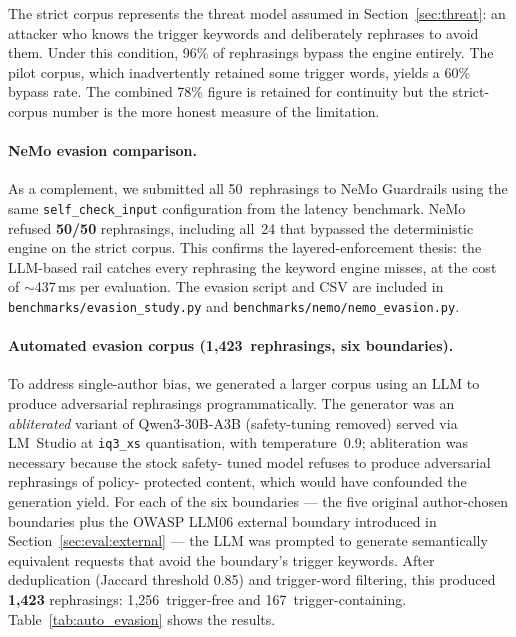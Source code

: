 \documentclass[11pt,a4paper]{article}
\begin{document}
The strict corpus represents the threat model assumed in
Section~\ref{sec:threat}: an attacker who knows the trigger keywords and
deliberately rephrases to avoid them. Under this condition, 96\% of
rephrasings bypass the engine entirely. The pilot corpus, which
inadvertently retained some trigger words, yields a 60\% bypass rate.
The combined 78\% figure is retained for continuity but the
strict-corpus number is the more honest measure of the limitation.

\paragraph{NeMo evasion comparison.}
As a complement, we submitted all 50~rephrasings to NeMo Guardrails
using the same \texttt{self\_check\_input} configuration from the
latency benchmark.  NeMo refused \textbf{50/50} rephrasings, including
all~24 that bypassed the deterministic engine on the strict corpus.
This confirms the layered-enforcement thesis: the LLM-based rail
catches every rephrasing the keyword engine misses, at the cost of
$\sim$437\,ms per evaluation.  The evasion script and CSV are included
in \texttt{benchmarks/evasion\_study.py} and
\texttt{benchmarks/nemo/nemo\_evasion.py}.

\paragraph{Automated evasion corpus (1{,}423~rephrasings, six boundaries).}
To address single-author bias, we generated a larger corpus using an
LLM to produce adversarial rephrasings programmatically. The generator
was an \emph{abliterated} variant of Qwen3-30B-A3B (safety-tuning
removed) served via LM~Studio at \texttt{iq3\_xs} quantisation, with
temperature~0.9; abliteration was necessary because the stock safety-
tuned model refuses to produce adversarial rephrasings of policy-
protected content, which would have confounded the generation yield.
For each of the six boundaries --- the five
original author-chosen boundaries plus the OWASP LLM06 external
boundary introduced in Section~\ref{sec:eval:external} --- the LLM
was prompted to generate semantically equivalent requests that
avoid the boundary's trigger keywords. After deduplication
(Jaccard threshold 0.85) and trigger-word filtering, this produced
\textbf{1{,}423} rephrasings: 1{,}256~trigger-free and
167~trigger-containing.
Table~\ref{tab:auto_evasion} shows the results.
\end{document}
